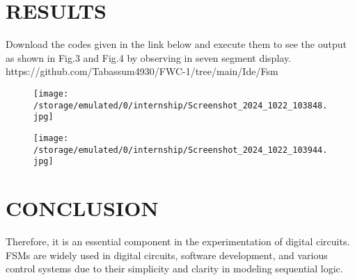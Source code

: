 \documentclass[conference]{IEEEtran}
\begin{document}
\section{RESULTS}
Download the codes given in the link below and execute them to see the output as shown in Fig.3 and Fig.4 by observing in seven segment display. 
\\ https://github.com/Tabassum4930/FWC-1/tree/main/Ide/Fsm
\begin{figure}[h] 
	\centering 
	\texttt{[image: /storage/emulated/0/internship/Screenshot\_2024\_1022\_103848.jpg]}
	\caption{\label{fig:Gates}}    
\end{figure}

\begin{figure}[h] 
	\centering 
	\texttt{[image: /storage/emulated/0/internship/Screenshot\_2024\_1022\_103944.jpg]}
	\caption{\label{fig:Gates}}    
\end{figure}

\section{CONCLUSION}
Therefore, it is an essential component in the experimentation of digital circuits. FSMs are widely used in digital circuits, software development, and various control systems due to their simplicity and clarity in modeling sequential logic.
\end{document}
